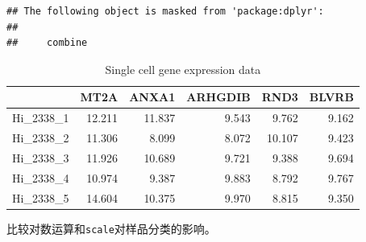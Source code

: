 \documentclass[]{article}
\newenvironment{Shaded}{\begin{snugshade}}{\end{snugshade}}
\newcommand{\KeywordTok}[1]{\textcolor[rgb]{0.13,0.29,0.53}{\textbf{{#1}}}}
\newcommand{\DataTypeTok}[1]{\textcolor[rgb]{0.13,0.29,0.53}{{#1}}}
\newcommand{\DecValTok}[1]{\textcolor[rgb]{0.00,0.00,0.81}{{#1}}}
\newcommand{\StringTok}[1]{\textcolor[rgb]{0.31,0.60,0.02}{{#1}}}
\newcommand{\CommentTok}[1]{\textcolor[rgb]{0.56,0.35,0.01}{\textit{{#1}}}}
\newcommand{\NormalTok}[1]{{#1}}
\numberwithin{figure}{section}
\numberwithin{table}{section}
\theoremstyle{definition}
\theoremstyle{definition}
\theoremstyle{definition}
\theoremstyle{remark}
\begin{document}
\begin{verbatim}
## The following object is masked from 'package:dplyr':
## 
##     combine
\end{verbatim}

\begin{Shaded}
\end{Shaded}

\begin{table}

\caption{\label{tab:pcaclustershowdata}Single cell gene expression data}
\centering
\begin{tabular}[t]{l|r|r|r|r|r}
\hline
  & MT2A & ANXA1 & ARHGDIB & RND3 & BLVRB\\
\hline
Hi\_2338\_1 & 12.211 & 11.837 & 9.543 & 9.762 & 9.162\\
\hline
Hi\_2338\_2 & 11.306 & 8.099 & 8.072 & 10.107 & 9.423\\
\hline
Hi\_2338\_3 & 11.926 & 10.689 & 9.721 & 9.388 & 9.694\\
\hline
Hi\_2338\_4 & 10.974 & 9.387 & 9.883 & 8.792 & 9.767\\
\hline
Hi\_2338\_5 & 14.604 & 10.375 & 9.970 & 8.815 & 9.350\\
\hline
\end{tabular}
\end{table}

比较对数运算和\texttt{scale}对样品分类的影响。
\end{document}
